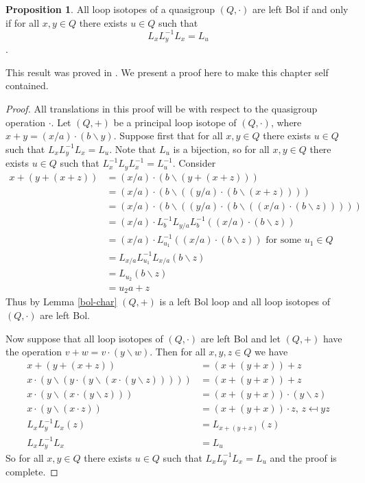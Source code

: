 \documentclass[12pt, twoside, openright]{report}
\theoremstyle{definition}
\newtheorem{prp}[thm]{Proposition}
\newcommand{\ldv}{\backslash}       %
\newcommand{\rdv}{/}                %
\begin{document}
\begin{prp}\label{iso-char}
  All loop isotopes of a quasigroup $(Q, \cdot)$ are left Bol if and only if for all $x, y\in Q$ there
    exists $u\in Q$ such that
  \[L_{x} L_{y}^{-1} L_x = L_u\].
\end{prp}

This result was proved in \cite{BK-isotopes}. We present a proof here to make this chapter self contained.

\begin{proof}
 All translations in this proof will be with respect to the quasigroup operation $\cdot$. Let $(Q, +)$
  be a principal loop isotope of $(Q, \cdot)$, where $x + y = (x\rdv a)\cdot (b\ldv y)$. Suppose
  first that for all $x, y\in Q$ there exists $u\in Q$ such that $L_x L_y^{-1} L_x = L_u$. Note
  that $L_u$ is a bijection, so for all $x, y\in Q$ there exists $u\in Q$ such that
  $L_x^{-1  }L_yL_x^{-1} = L_u^{-1}$. Consider
  \begin{align*}
    x + (y + (x + z)) &= (x\rdv a) \cdot (b\ldv (y + (x + z)))\\
    &= (x\rdv a)\cdot (b\ldv((y\rdv a)\cdot (b\ldv(x + z))))\\
    &= (x\rdv a)\cdot (b\ldv((y\rdv a)\cdot (b\ldv((x\rdv a)\cdot (b\ldv z)))))\\
    &= (x\rdv a)\cdot L_b^{-1} L_{y\rdv a} L_b^{-1}((x\rdv a)\cdot (b\ldv z))\\
    &= (x\rdv a)\cdot L_{u_1}^{-1}((x\rdv a)\cdot (b\ldv z))\text{ for some $u_1\in Q$}\\
    &= L_{x\rdv a}L_{u_1}^{-1}L_{x\rdv a}(b\ldv z)\\
    &= L_{u_2}(b\ldv z)\\
    &= u_2 a + z
  \end{align*}
  Thus by Lemma \ref{bol-char} $(Q, +)$ is a left Bol loop and all loop isotopes of $(Q, \cdot)$ are left Bol.

  Now suppose that all loop isotopes of $(Q, \cdot)$ are left Bol and let $(Q, +)$ have the operation
    $v + w = v\cdot (y\ldv w)$. Then for all $x, y, z\in Q$ we have
  \begin{align*}
    x + (y + (x + z)) &= (x + (y + x)) + z\\
    x\cdot (y\ldv (y\cdot (y\ldv (x\cdot (y\ldv z))))) &= (x + (y + x)) + z\\
    x\cdot (y\ldv (x\cdot (y\ldv z))) &= (x + (y + x))\cdot (y\ldv z)\\
    x\cdot (y\ldv (x\cdot z)) &= (x + (y + x))\cdot z\text{, $z\mapsfrom yz$}\\
    L_x L_y^{-1} L_x (z) &= L_{x + (y + x)}(z)\\
    L_x L_y^{-1} L_x &= L_u
  \end{align*}
  So for all $x, y\in Q$ there exists $u\in Q$ such that $L_x L_y^{-1} L_x = L_u$ and the proof is complete.
\end{proof}
\end{document}
